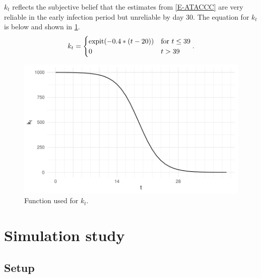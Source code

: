 \documentclass[thesis.tex]{subfiles}
\begin{document}
$k_t$ reflects the subjective belief that the estimates from \cref{E-ATACCC} are very reliable in the early infection period but unreliable by day 30.
The equation for $k_t$ is below and shown in \cref{perf-test:fig:kt}.
\begin{align}
k_t = \begin{cases}
  \operatorname{expit}(-0.4 * (t - 20)) &\text{for $t \leq 39$} \\
  0 &t > 39
\end{cases}.
\end{align}

\begin{figure}
  \centering \includegraphics{cis-perfect-testing/kt-prior}
  \caption{Function used for $k_t$. \label{perf-test:fig:kt}}
\end{figure}

\section{Simulation study} \label{perf-test:sec:simulation-study}

\subsection{Setup}
\end{document}
